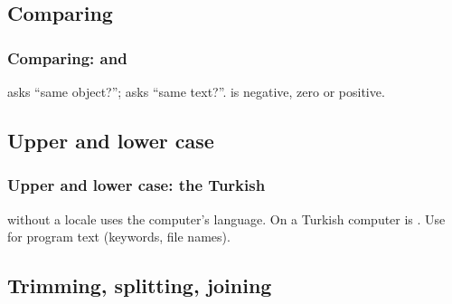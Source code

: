 \documentclass[aspectratio=169,10pt,compress]{beamer}
\begin{document}
\subsection[Compare]{Comparing}




\begin{frame}[t,fragile] \frametitle{Comparing:  and }

  \vspace{0.3em}
  \small \hCode{==} asks ``same object?'';  asks ``same text?''.  is negative, zero or positive.
\end{frame}

\subsection[Case]{Upper and lower case}




\begin{frame}[t,fragile] \frametitle{Upper and lower case: the Turkish }

  \vspace{0.3em}
  \small {}  without a locale uses the computer's language. On a Turkish
  computer  is . Use  for program text (keywords, file names).
\end{frame}


\subsection[Split]{Trimming, splitting, joining}
\end{document}
